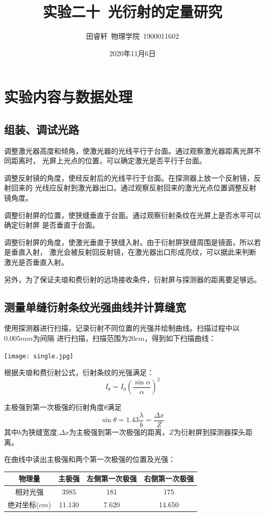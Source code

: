 \documentclass{article}
\title{\heiti 实验二十\ 光衍射的定量研究}
\author{\kaishu 田睿轩\ 物理学院\ 1900011602}
\date{2020年11月6日}
\begin{document}
    \maketitle

    \section{实验内容与数据处理}
    
    \subsection{组装、调试光路}
    调整激光器高度和倾角，使激光器的光线平行于台面。通过观察激光器距离光屏不同距离时，
    光屏上光点的位置，可以确定激光是否平行于台面。

    调整反射镜的角度，使经反射后的光线平行于台面。在探测器上放一个反射镜，反射回来的
    光线应反射到激光器出口。通过观察反射回来的激光光点位置调整反射镜角度。

    调整衍射屏的位置，使狭缝垂直于台面。通过观察衍射条纹在光屏上是否水平可以确定衍射屏
    是否垂直于台面。

    调整衍射屏的角度，使激光垂直于狭缝入射。由于衍射屏狭缝周围是镜面，所以若是垂直入射，
    激光会被反射回反射镜，在激光器出口形成亮纹，可以据此来判断激光是否垂直入射。

    另外，为了保证夫琅和费衍射的远场接收条件，衍射屏与探测器的距离要足够远。

    \subsection{测量单缝衍射条纹光强曲线并计算缝宽}
    使用探测器进行扫描，记录衍射不同位置的光强并绘制曲线。扫描过程中以$0.005mm$为间隔
    进行扫描，扫描范围为$20cm$，得到如下扫描曲线：

    \vspace{2ex}
    \texttt{[image: single.jpg]}

    根据夫琅和费衍射公式，衍射条纹的光强满足：
    $$I_\theta = I_0(\frac{\sin \alpha}{\alpha})^2$$
    
    主极强到第一次极强的衍射角度$\theta$满足
    $$\sin \theta=1.43\frac{\lambda}{b}=\frac{\Delta x}{Z}$$
    其中$b$为狭缝宽度,$\Delta x$为主极强到第一次极强的距离，$Z$为衍射屏到探测器探头距离。
    
    在曲线中读出主极强和两个第一次极强的位置及光强：
    
    \begin{center}
        \begin{tabular}{|c|c|c|c|}
            \hline
            物理量 & 主极强 & 左侧第一次极强 & 右侧第一次极强 \\
            \hline
            相对光强 & 3985 & 181 & 175 \\
            \hline
            绝对坐标($cm$) & 11.130 & 7.620 & 14.650\\
            \hline
        \end{tabular}
    \end{center}
\end{document}
